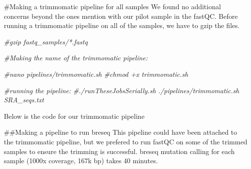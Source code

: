 \documentclass[
]{article}
\newenvironment{Shaded}{\begin{snugshade}}{\end{snugshade}}
\newcommand{\CommentTok}[1]{\textcolor[rgb]{0.56,0.35,0.01}{\textit{#1}}}
\begin{document}
\#Making a trimmomatic pipeline for all samples We found no additional
concerns beyond the ones mention with our pilot sample in the fastQC.
Before running a trimmomatic pipeline on all of the samples, we have to
gzip the files.

\begin{Shaded}
\begin{Highlighting}[]
\CommentTok{#gzip fastq_samples/*.fastq}

\CommentTok{#Making the name of the trimmomatic pipeline:}

\CommentTok{#nano pipelines/trimmomatic.sh}
\CommentTok{#chmod +x trimmomatic.sh}

\CommentTok{#running the pipeline: }
\CommentTok{#./runTheseJobsSerially.sh ./pipelines/trimmomatic.sh SRA_seqs.txt}
\end{Highlighting}
\end{Shaded}

Below is the code for our trimmomatic pipeline

\begin{Shaded}
\end{Shaded}

\#\#Making a pipeline to run breseq This pipeline could have been
attached to the trimmomatic pipeline, but we prefered to run fastQC on
some of the trimmed samples to ensure the trimming is successful. breseq
mutation calling for each sample (1000x coverage, 167k bp) takes 40
minutes.
\end{document}
